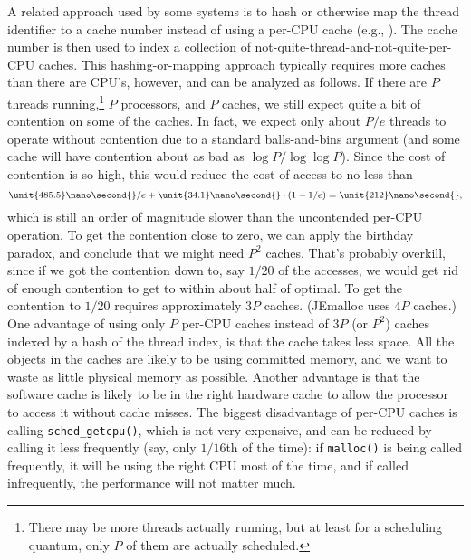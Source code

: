 \documentclass[natbib,sort&compress,10pt]{sigplanconf}
\newcommand{\code}[1]{\texttt{#1}}
\newcommand{\ns}[1]{\unit{#1}\nano\second{}}
\begin{document}
A related approach used by some systems is to hash or otherwise map
the thread identifier to a cache number instead of using a per-CPU
cache (e.g., \cite{LarsonKr98, Evans06}).  The cache number is then
used to index a collection of not-quite-thread-and-not-quite-per-CPU
caches.  This hashing-or-mapping approach typically requires more
caches than there are CPU's, however, and can be analyzed as follows.
If there are $P$ threads running,\footnote{There may be more threads
  actually running, but at least for a scheduling quantum, only $P$ of
  them are actually scheduled.} $P$ processors, and $P$ caches, we
still expect quite a bit of contention on some of the caches.  In
fact, we expect only about $P/e$ threads to operate without contention
due to a standard balls-and-bins argument (and some cache will have
contention about as bad as $\log P/\log\log P$).  Since the cost of
contention is so high, this would reduce the cost of access to no less
than
\[ \ns{485.5}/e + \ns{34.1}\cdot(1-1/e) = \ns{212},\]
which is still an order of magnitude slower than the uncontended
per-CPU operation.  To get the contention close to zero, we can apply
the birthday paradox, and conclude that we might need $P^2$ caches.
That's probably overkill, since if we got the contention down to, say
$1/20$ of the accesses, we would get rid of enough contention to get
to within about half of optimal.  To get the contention to $1/20$
requires approximately $3P$ caches.  (JEmalloc uses $4P$ caches.)  One
advantage of using only $P$ per-CPU caches instead of $3P$ (or $P^2$)
caches indexed by a hash of the thread index, is that the cache takes
less space.  All the objects in the caches are likely to be using
committed memory, and we want to waste as little physical memory as
possible.  Another advantage is that the software cache is likely to
be in the right hardware cache to allow the processor to access it
without cache misses.  The biggest disadvantage of per-CPU caches is
calling \code{sched\_getcpu()}, which is not very expensive, and can
be reduced by calling it less frequently (say, only $1/16$th of the
time): if \texttt{malloc()} is being called frequently, it will be
using the right CPU most of the time, and if called infrequently, the
performance will not matter much.
\end{document}
